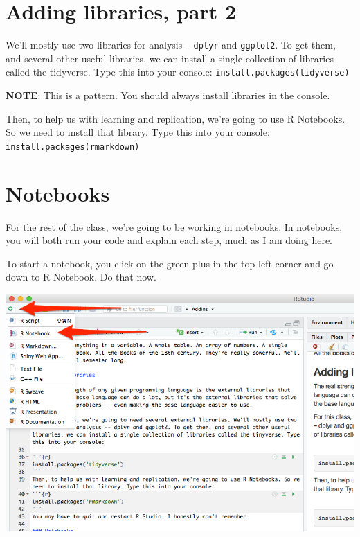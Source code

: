 \documentclass[
]{book}
\begin{document}
\hypertarget{adding-libraries-part-2}{%
\section{Adding libraries, part 2}\label{adding-libraries-part-2}}

We'll mostly use two libraries for analysis -- \texttt{dplyr} and \texttt{ggplot2}. To get them, and several other useful libraries, we can install a single collection of libraries called the tidyverse. Type this into your console: \texttt{install.packages(\textquotesingle{}tidyverse\textquotesingle{})}

\textbf{NOTE}: This is a pattern. You should always install libraries in the console.

Then, to help us with learning and replication, we're going to use R Notebooks. So we need to install that library. Type this into your console: \texttt{install.packages(\textquotesingle{}rmarkdown\textquotesingle{})}

\hypertarget{notebooks}{%
\section{Notebooks}\label{notebooks}}

For the rest of the class, we're going to be working in notebooks. In notebooks, you will both run your code and explain each step, much as I am doing here.

To start a notebook, you click on the green plus in the top left corner and go down to R Notebook. Do that now.

\includegraphics[width=11.08in]{images/verybasics2}
\end{document}
